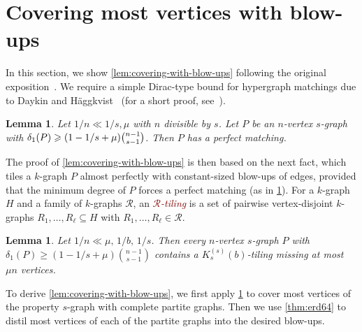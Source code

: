 \documentclass[12pt,reqno]{amsart}
\theoremstyle{plain}
\newtheorem{lemma}[theorem]{Lemma}
\theoremstyle{definition}
\numberwithin{equation}{section}
\renewcommand{\geq}{\geqslant}
\renewcommand{\subset}{\subseteq}
\newcommand{\defn}[1]{\textcolor{Maroon}{\emph{#1}}}
\newcommand{\cR}{\mathcal{R}}
\begin{document}
	\appendix
	
	\section{Covering most vertices with blow-ups}\label{lem:almost-blow-up-cover}
	
	In this section, we show \cref{lem:covering-with-blow-ups} following the original exposition~\cite[Lemma~4.4]{lang2023tiling}.
	We require a simple Dirac-type bound for hypergraph matchings due to Daykin and H\"{a}ggkvist~\cite{DH81} (for a short proof, see~\cite[Lemma~B.2]{langsanhueza2024dirac}).
	
	\begin{lemma}\label{lem:matching}
		Let $ 1/n \ll 1/s, \mu$ with $n$ divisible by $s$.
		Let $P$ be an $n$-vertex $s$-graph with $\delta_1(P) \geq (1 - 1/s + \mu) \tbinom{n-1}{s-1}$.
		Then $P$ has a perfect matching.
	\end{lemma}
	
	The proof of \cref{lem:covering-with-blow-ups} is then based on the next fact, which tiles a $k$-graph $P$ almost perfectly with constant-sized blow-ups of edges, provided that the minimum degree of $P$ forces a perfect matching (as in \cref{lem:matching}).
	For a $k$-graph $H$ and a family of $k$-graphs $\cR$, an \defn{$\cR$-tiling} is a set of pairwise vertex-disjoint $k$-graphs $R_1,\dots,R_\ell \subset H$ with $R_1,\dots,R_\ell \in \cR$.
	
	\begin{lemma}\label{lem:blow-up-matching}
		Let $1/n \ll \mu,\, 1/b,\, 1/s$.
		Then every $n$-vertex $s$-graph $P$ with $\delta_1(P) \geq (1-1/s+\mu) \binom{n-1}{s-1}$ contains a $K_s^{(s)}(b)$-tiling missing at most $\mu n$ vertices.
	\end{lemma}
	
	To derive \cref{lem:covering-with-blow-ups}, we first apply \cref{lem:blow-up-matching} to cover most vertices of the property $s$-graph with complete partite graphs.
	Then we use \cref{thm:erd64} to distil most vertices of each of the partite graphs into the desired blow-ups.
	
\end{document}
